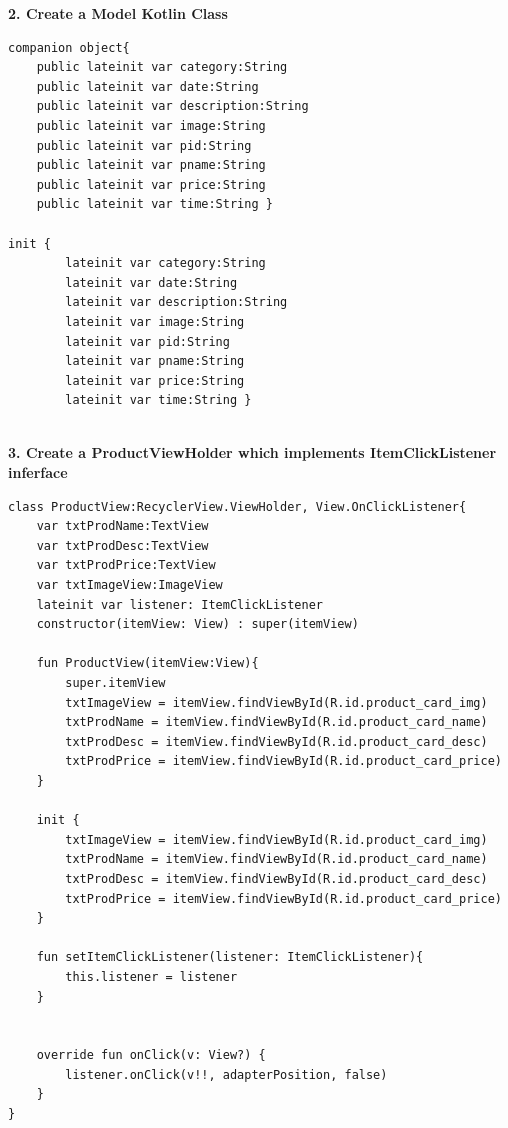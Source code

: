 \textbf{2. Create a Model Kotlin Class}
\begin{verbatim}
companion object{
    public lateinit var category:String
    public lateinit var date:String
    public lateinit var description:String
    public lateinit var image:String
    public lateinit var pid:String
    public lateinit var pname:String
    public lateinit var price:String
    public lateinit var time:String }
    
init {
        lateinit var category:String
        lateinit var date:String
        lateinit var description:String
        lateinit var image:String
        lateinit var pid:String
        lateinit var pname:String
        lateinit var price:String
        lateinit var time:String }
    
\end{verbatim}
\newpage
\textbf{3. Create a ProductViewHolder which implements ItemClickListener inferface}
\begin{verbatim}
class ProductView:RecyclerView.ViewHolder, View.OnClickListener{
    var txtProdName:TextView
    var txtProdDesc:TextView
    var txtProdPrice:TextView
    var txtImageView:ImageView
    lateinit var listener: ItemClickListener
    constructor(itemView: View) : super(itemView)

    fun ProductView(itemView:View){
        super.itemView
        txtImageView = itemView.findViewById(R.id.product_card_img)
        txtProdName = itemView.findViewById(R.id.product_card_name)
        txtProdDesc = itemView.findViewById(R.id.product_card_desc)
        txtProdPrice = itemView.findViewById(R.id.product_card_price)
    }

    init {
        txtImageView = itemView.findViewById(R.id.product_card_img)
        txtProdName = itemView.findViewById(R.id.product_card_name)
        txtProdDesc = itemView.findViewById(R.id.product_card_desc)
        txtProdPrice = itemView.findViewById(R.id.product_card_price)
    }

    fun setItemClickListener(listener: ItemClickListener){
        this.listener = listener
    }


    override fun onClick(v: View?) {
        listener.onClick(v!!, adapterPosition, false)
    }
}

\end{verbatim}

